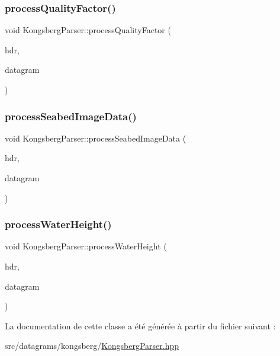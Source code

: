 \subsubsection{\texorpdfstring{process\+Quality\+Factor()}{processQualityFactor()}}
{\footnotesize\ttfamily void Kongsberg\+Parser\+::process\+Quality\+Factor (\begin{DoxyParamCaption}\item[{\hyperlink{structKongsbergHeader}{Kongsberg\+Header} \&}]{hdr,  }\item[{unsigned char $\ast$}]{datagram }\end{DoxyParamCaption})\hspace{0.3cm}{\ttfamily [private]}}

\mbox{\label{classKongsbergParser_afa9fad0b7e76896ca18294c145353c87}} 
\subsubsection{\texorpdfstring{process\+Seabed\+Image\+Data()}{processSeabedImageData()}}
{\footnotesize\ttfamily void Kongsberg\+Parser\+::process\+Seabed\+Image\+Data (\begin{DoxyParamCaption}\item[{\hyperlink{structKongsbergHeader}{Kongsberg\+Header} \&}]{hdr,  }\item[{unsigned char $\ast$}]{datagram }\end{DoxyParamCaption})\hspace{0.3cm}{\ttfamily [private]}}

\mbox{\label{classKongsbergParser_a9af87754001eb5c6fa6761146a78e29e}} 
\subsubsection{\texorpdfstring{process\+Water\+Height()}{processWaterHeight()}}
{\footnotesize\ttfamily void Kongsberg\+Parser\+::process\+Water\+Height (\begin{DoxyParamCaption}\item[{\hyperlink{structKongsbergHeader}{Kongsberg\+Header} \&}]{hdr,  }\item[{unsigned char $\ast$}]{datagram }\end{DoxyParamCaption})\hspace{0.3cm}{\ttfamily [private]}}



La documentation de cette classe a été générée à partir du fichier suivant \+:\begin{DoxyCompactItemize}
\item 
src/datagrams/kongsberg/\hyperlink{KongsbergParser_8hpp}{Kongsberg\+Parser.\+hpp}\end{DoxyCompactItemize}
